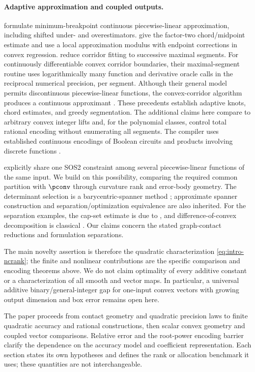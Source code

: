 \paragraph{Adaptive approximation and coupled outputs.}
\citet{rebennack2015} formulate minimum-breakpoint continuous
piecewise-linear approximation, including shifted under- and
overestimators. \citet[Lemma 2.1]{simchowitz2018} give the factor-two
chord/midpoint estimate and use a local approximation modulus with endpoint
corrections in convex regression. \citet[Sections 3--4]{codsi2025} reduce
corridor fitting to successive maximal segments. For continuously
differentiable convex corridor boundaries, their maximal-segment routine
uses logarithmically many function and derivative oracle calls in the
reciprocal numerical precision, per segment. Although their general model
permits discontinuous piecewise-linear functions, the convex-corridor
algorithm produces a continuous approximant \citep[Remark 3]{codsi2025}.
These precedents establish
adaptive knots, chord estimates, and greedy segmentation. The additional
claims here compare to arbitrary convex integer lifts and, for the
polynomial classes, control total rational encoding without enumerating
all segments. The compiler uses established continuous encodings of
Boolean circuits \citep{avis2019} and products involving discrete
functions \citep{adams2012}.

\citet[Proposition 1]{lyu2026} explicitly share one SOS2 constraint among
several piecewise-linear functions of the same input. We build on this
possibility, comparing the required common partition with $\pconv$ through
curvature rank and error-body geometry. The determinant selection is a
barycentric-spanner method \citep{awerbuch2004}; approximate spanner
construction \citep{plevrakis2020} and separation/optimization equivalence
\citep{gls1981} are also inherited. For the separation examples, the cap-set
estimate is due to \citet{ellenberg2017}, and difference-of-convex
decomposition is classical \citep{hartman1959}. Our claims concern the
stated graph-contact reductions and formulation separations.

The main novelty assertion is therefore the quadratic characterization
\eqref{eq:intro-ncrank}; the finite and nonlinear contributions are the
specific comparison and encoding theorems above. We do not claim optimality
of every additive constant or a characterization of all smooth and vector
maps. In particular, a universal additive binary/general-integer gap for
one-input convex vectors with growing output dimension and box error
remains open here.

The paper proceeds from contact geometry and quadratic precision laws to
finite quadratic accuracy and rational constructions, then scalar convex
geometry and coupled vector comparisons. Relative error and the
root-power encoding barrier clarify the dependence on the accuracy model
and coefficient representation. Each section states its own hypotheses
and defines the rank or allocation benchmark it uses; these quantities
are not interchangeable.
